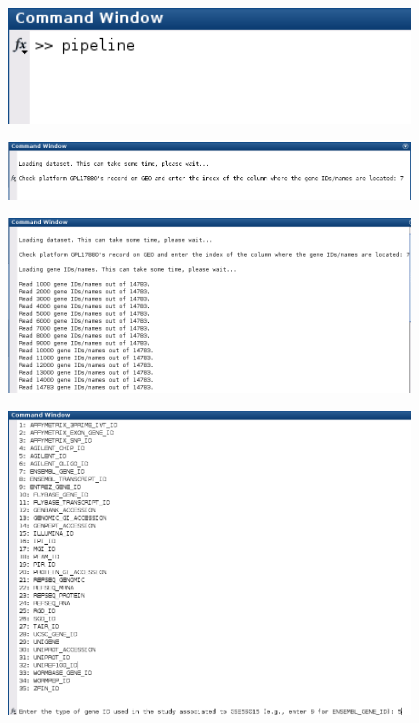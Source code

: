 \documentclass[final,letterpaper,12pt]{article}
\begin{document}
\begin{figure}
	\centering
	\includegraphics[width=0.95\textwidth]{pipeline_ex1}
	\caption{}
	\label{fig:pipeline_ex1}
\end{figure}

\begin{figure}
	\centering
	\includegraphics[width=0.95\textwidth]{pipeline_ex2}
	\caption{}
	\label{fig:pipeline_ex2}
\end{figure}

\begin{figure}
	\centering
	\includegraphics[width=0.95\textwidth]{pipeline_ex3}
	\caption{}
	\label{fig:pipeline_ex3}
\end{figure}

\begin{figure}
	\centering
	\includegraphics[width=0.95\textwidth]{pipeline_ex4}
	\caption{}
	\label{fig:pipeline_ex4}
\end{figure}
\end{document}
